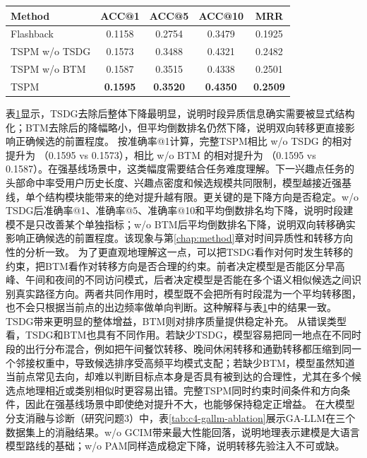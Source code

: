 \begin{table}[htbp]
    \tblstyle
    \label{tab:ablation}
    \begin{tabular}{lcccc}
        \toprule
        Method & ACC@1 & ACC@5 & ACC@10 & MRR \\
        \midrule
        Flashback & 0.1158 & 0.2754 & 0.3479 & 0.1925 \\
        TSPM w/o TSDG & 0.1573 & 0.3488 & 0.4321 & 0.2482 \\
        TSPM w/o BTM & 0.1587 & 0.3515 & 0.4338 & 0.2501 \\
        TSPM & \textbf{0.1595} & \textbf{0.3520} & \textbf{0.4350} & \textbf{0.2509} \\
        \bottomrule
    \end{tabular}
\end{table}

表\ref{tab:ablation}显示，TSDG去除后整体下降最明显，说明时段异质信息确实需要被显式结构化；BTM去除后的降幅略小，但平均倒数排名仍然下降，说明双向转移更直接影响正确候选的前置程度。
按准确率@1计算，完整TSPM相比 w/o TSDG 的相对提升为 （0.1595 vs 0.1573），相比 w/o BTM 的相对提升为 （0.1595 vs 0.1587）。在强基线场景中，这类幅度需要结合任务难度理解。下一兴趣点任务的头部命中率受用户历史长度、兴趣点密度和候选规模共同限制，模型越接近强基线，单个结构模块能带来的绝对提升越有限。更关键的是下降方向是否稳定。w/o TSDG后准确率@1、准确率@5、准确率@10和平均倒数排名均下降，说明时段建模不是只改善某个单独指标；w/o BTM后平均倒数排名下降，说明双向转移确实影响正确候选的前置程度。该现象与第\ref{chap:method}章对时间异质性和转移方向性的分析一致。
为了更直观地理解这一点，可以把TSDG看作对何时发生转移的约束，把BTM看作对转移方向是否合理的约束。前者决定模型是否能区分早高峰、午间和夜间的不同访问模式，后者决定模型是否能在多个语义相似候选之间识别真实路径方向。两者共同作用时，模型既不会把所有时段混为一个平均转移图，也不会只根据当前点的出边频率做单向判断。这种解释与表\ref{tab:ablation}中的结果一致。TSDG带来更明显的整体增益，BTM则对排序质量提供稳定补充。
从错误类型看，TSDG和BTM也具有不同作用。若缺少TSDG，模型容易把同一地点在不同时段的出行分布混合，例如把午间餐饮转移、晚间休闲转移和通勤转移都压缩到同一个邻接权重中，导致候选排序受高频平均模式支配；若缺少BTM，模型虽然知道当前点常见去向，却难以判断目标点本身是否具有被到达的合理性，尤其在多个候选点地理相近或类别相似时更容易出错。完整TSPM同时约束时间条件和方向条件，因此在强基线场景中即使绝对提升不大，也能够保持稳定正增益。
在大模型分支消融与诊断（研究问题3）中，表\ref{tab:c4-gallm-ablation}展示GA-LLM在三个数据集上的消融结果。w/o GCIM带来最大性能回落，说明地理表示建模是大语言模型路线的基础；w/o PAM同样造成稳定下降，说明转移先验注入不可或缺。

